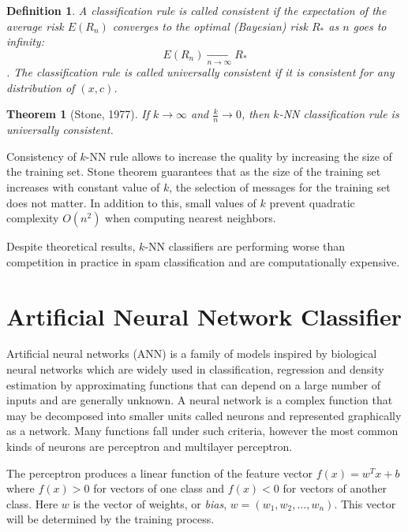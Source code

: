 \documentclass[12pt]{report}
\newtheorem{theorem}{Theorem}[section]
\newtheorem{definition}{Definition}[section]
\begin{document}
\begin{definition}
	A classification rule is called consistent if the expectation of the average risk $E(R_n)$ converges to the optimal (Bayesian) risk $R_*$ as $n$ goes to infinity:
	$$E(R_n) \xrightarrow[n \rightarrow \infty]{} R_*$$.
	The classification rule is called universally consistent if it is consistent for any distribution of $(x, c)$.
\end{definition}

\begin{theorem}[Stone, 1977]
	If $k \rightarrow \infty$ and $\frac{k}{n} \rightarrow 0$, then $k$-NN classification rule is universally consistent.
\end{theorem}

Consistency of $k$-NN rule allows to increase the quality by increasing the size of the training set. Stone theorem guarantees that as the size of the training set increases with constant value of $k$, the selection of messages for the training set does not matter. In addition to this, small values of $k$ prevent quadratic complexity $O(n^2)$ when computing nearest neighbors.

Despite theoretical results, $k$-NN classifiers are performing worse than competition in practice in spam classification and are computationally expensive.

\newpage

\section{Artificial Neural Network Classifier}

Artificial neural networks (ANN) is a family of models inspired by biological neural networks which are widely used in classification, regression and density estimation by approximating functions that can depend on a large number of inputs and are generally unknown. A neural network is a complex function that may be decomposed into smaller units called neurons and represented graphically as a network. Many functions fall under such criteria, however the most common kinds of neurons are perceptron and multilayer perceptron.

The perceptron produces a linear function of the feature vector $f(x) = w^Tx + b$ where $f(x) > 0$ for vectors of one class and $f(x) < 0$ for vectors of another class. Here $w$ is the vector of weights, or \textit{bias}, $w = (w_1, w_2, \dots, w_n)$. This vector will be determined by the training process.
\end{document}
